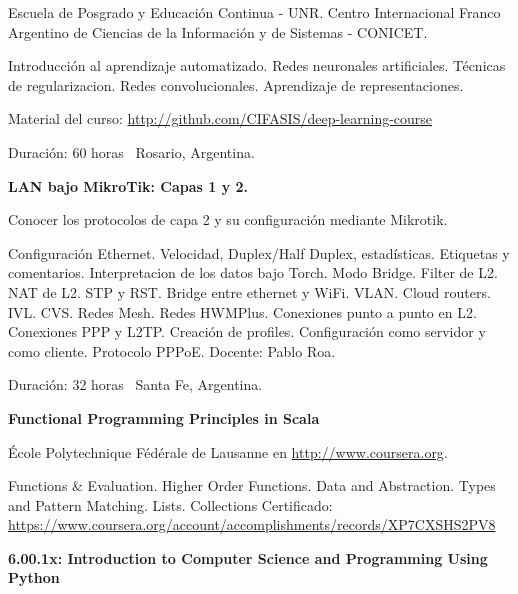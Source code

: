 \documentclass[letterpaper,MMMyyyy,nonstop]{simpleresumecv}
\begin{document}
\begin{body}
\BulletItem Escuela de Posgrado y Educación Continua - UNR. Centro Internacional Franco Argentino de Ciencias de la Información y de Sistemas - CONICET.
\begin{detail}
	\SubBulletItem 
	Introducción al aprendizaje automatizado. Redes neuronales artificiales. Técnicas de regularizacion. Redes convolucionales. Aprendizaje de representaciones.
	
	\SubBulletItem
	Material del curso: \href{http://github.com/CIFASIS/deep-learning-course}
	{http://github.com/CIFASIS/deep-learning-course}
\end{detail}
Duración: 60 horas \SubBulletSymbol\, Rosario, Argentina.

\BigGap

\textbf{LAN bajo MikroTik: Capas 1 y 2.}
\hfill
{}

\BulletItem Conocer los protocolos de capa 2 y su configuración mediante Mikrotik.

\begin{detail}
	\SubBulletItem 
	Configuración Ethernet. Velocidad, Duplex/Half Duplex, estadísticas. Etiquetas y comentarios. Interpretacion de los datos bajo Torch. Modo Bridge.  Filter de L2. NAT de L2. STP y RST. Bridge entre ethernet y WiFi. VLAN. Cloud routers. IVL. CVS. Redes Mesh. Redes HWMPlus. Conexiones punto a punto en L2. Conexiones  PPP y L2TP.  Creación de profiles.  Configuración como servidor y como cliente. Protocolo PPPoE.
	\SubBulletItem Docente: Pablo Roa.
\end{detail}
Duración: 32 horas \SubBulletSymbol\, Santa Fe, Argentina.

\BigGap
\textbf{Functional Programming Principles in Scala}
\hfill
{}

\BulletItem École Polytechnique Fédérale de Lausanne en \href{coursera.org}{http://www.coursera.org}.
\begin{detail}
	\SubBulletItem
	Functions \& Evaluation. Higher Order Functions. Data and Abstraction. Types and Pattern Matching. Lists. Collections
	\SubBulletItem
	Certificado: \href{https://www.coursera.org/account/accomplishments/records/XP7CXSHS2PV8}
	{https://www.coursera.org/account/accomplishments/records/XP7CXSHS2PV8}
	
\end{detail}


\BigGap
\textbf{6.00.1x: Introduction to Computer Science and Programming Using Python }
\hfill
{}


\end{body}
\end{document}
